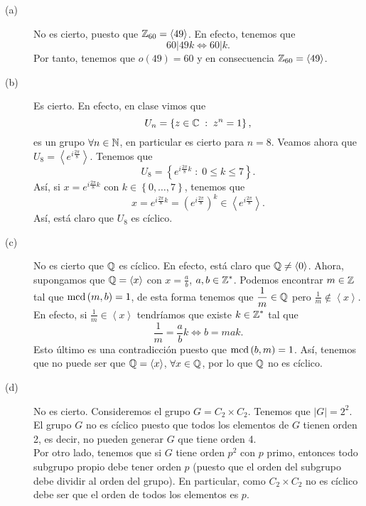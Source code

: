 \documentclass{article}
\begin{document}
\begin{sol}
\begin{description}
\item[(a)] No es cierto, puesto que $\displaystyle \mathbb{Z}_{60} = \left\langle 49 \right\rangle  $. En efecto, tenemos que 
	\[60 | 49k \iff 60 | k .\]
	Por tanto, tenemos que $\displaystyle o\left(49\right) = 60 $ y en consecuencia $\displaystyle \mathbb{Z}_{60} = \left\langle 49 \right\rangle  $.
\item[(b)] Es cierto. En efecto, en clase vimos que
	\[U_{n} = \left\{ z \in \mathbb{C} \; : \; z^{n} = 1\right\}  ,\]
	es un grupo $\displaystyle \forall n \in \mathbb{N} $, en particular es cierto para $\displaystyle n = 8 $. Veamos ahora que $\displaystyle U_{8} = \left\langle e^{i\frac{2\pi }{8}} \right\rangle  $. Tenemos que
	\[U_{8} = \left\{ e^{i\frac{2\pi }{8}k} \; : \; 0 \leq k \leq 7\right\}  .\]
	Así, si $\displaystyle x = e^{i \frac{2\pi }{8}k} $ con $\displaystyle k \in \left\{ 0, \ldots, 7\right\}  $, tenemos que
	\[x = e^{i \frac{2\pi }{8}k} = \left(e^{i \frac{2\pi }{8}}\right)^{k} \in \left\langle e^{i \frac{2\pi }{8}} \right\rangle  .\]
	Así, está claro que $\displaystyle U_{8}  $ es cíclico.
\item[(c)] No es cierto que $\displaystyle \mathbb{Q} $ es cíclico. En efecto, está claro que $\displaystyle \mathbb{Q} \neq \left\langle 0 \right\rangle  $. Ahora, supongamos que $\displaystyle \mathbb{Q} = \left\langle x \right\rangle  $ con $\displaystyle x = \frac{a}{b} $, $\displaystyle a ,b \in \mathbb{Z}^{*} $. Podemos encontrar $\displaystyle m \in \mathbb{Z} $ tal que $\displaystyle \text{mcd}\left(m,b\right) = 1 $, de esta forma tenemos que $\displaystyle \frac{1}{m} \in \mathbb{Q} $ pero $\displaystyle \frac{1}{m} \not\in \left\langle x \right\rangle  $. En efecto, si $\displaystyle \frac{1}{m} \in \left\langle x \right\rangle  $ tendríamos que existe $\displaystyle k \in \mathbb{Z}^{*} $ tal que 
	\[\frac{1}{m} = \frac{a}{b}k \iff b = mak .\]
	Esto último es una contradicción puesto que $\displaystyle \text{mcd}\left(b,m\right) = 1 $. Así, tenemos que no puede ser que $\displaystyle \mathbb{Q} = \left\langle x \right\rangle  $, $\displaystyle \forall x \in \mathbb{Q} $, por lo que $\displaystyle \mathbb{Q} $ no es cíclico. 
\item[(d)] No es cierto. Consideremos el grupo $\displaystyle G = C_{2} \times C_{2} $. Tenemos que $\displaystyle \left|G\right|=2^{2} $. El grupo $\displaystyle G $ no es cíclico puesto que todos los elementos de $\displaystyle G $ tienen orden 2, es decir, no pueden generar $\displaystyle G $ que tiene orden 4. \\
	Por otro lado, tenemos que si $\displaystyle G $ tiene orden $\displaystyle p^{2} $ con $\displaystyle p $ primo, entonces todo subgrupo propio debe tener orden $\displaystyle p $ (puesto que el orden del subgrupo debe dividir al orden del grupo). En particular, como $\displaystyle C_{2} \times C_{2} $ no es cíclico debe ser que el orden de todos los elementos es $\displaystyle p $.

\end{description}
\end{sol}
\end{document}
